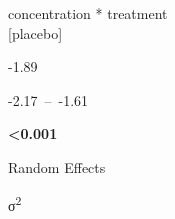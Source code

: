 \documentclass[
  letterpaper,
  DIV=11,
  numbers=noendperiod]{scrartcl}
\begin{document}
\begin{table}
\begin{minipage}[t]{\linewidth}
{}

\end{minipage}%
\newline
\begin{minipage}[t]{\linewidth}

{\centering 

concentration * treatment\\
{[}placebo{]}

}

\end{minipage}%
\newline
\begin{minipage}[t]{\linewidth}

{\centering 

-1.89

}

\end{minipage}%
\newline
\begin{minipage}[t]{\linewidth}

{\centering 

-2.17~--~-1.61

}

\end{minipage}%
\newline
\begin{minipage}[t]{\linewidth}

{\centering 

\textbf{\textless0.001}

}

\end{minipage}%
\newline
\begin{minipage}[t]{\linewidth}

{\centering 

Random Effects

}

\end{minipage}%
\newline
\begin{minipage}[t]{\linewidth}

{\centering 

σ\textsuperscript{2}

}

\end{minipage}%
\newline
\begin{minipage}[t]{\linewidth}

{\centering 

}
\end{minipage}
\end{table}
\end{document}
